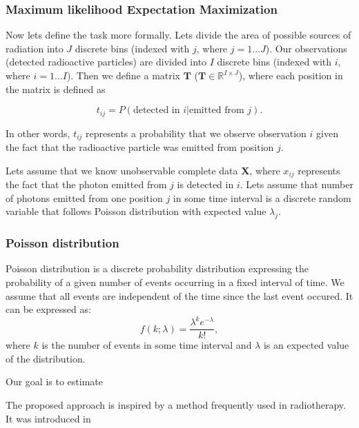 \subsubsection{Maximum likelihood Expectation Maximization}

Now lets define the task more formally.
Lets divide the area of possible sources of radiation into $J$ discrete bins (indexed with $j$, where $j = 1 \dotsc J$).
Our observations (detected radioactive particles) are divided into $I$ discrete bins (indexed with $i$, where $i = 1 \dotsc I$).
Then we define a matrix $\mathbf{T}$ ($\mathbf{T} \in \mathbb{R}^{I \times J}$), where each position in the matrix is defined as

\begin{equation}
  t_{ij} =  P(\textrm{detected in } i | \textrm{emitted from } j).
\end{equation}

In other words, $t_{ij}$ represents a probability that we observe observation $i$ given the fact that the radioactive particle was emitted from position $j$.

Lets assume that we know unobservable complete data $\mathbf{X}$, where $x_{ij}$ represents the fact that the photon emitted from $j$ is detected in $i$.
Lets assume that number of photons emitted from one position $j$ in some time interval is a discrete random variable that follows Poisson distribution with expected value $\lambda_{j}$.









\subsubsection{Poisson distribution}
Poisson distribution is a discrete probability distribution expressing the probability of a given number of events occurring in a fixed interval of time.
We assume that all events are independent of the time since the last event occured.
It can be expressed as:
\begin{equation}
  f(k;\lambda )={\frac {\lambda ^{k}e^{-\lambda }}{k!}},
\end{equation}
where $k$ is the number of events in some time interval and $\lambda$ is an expected value of the distribution.



Our goal is to estimate 

The proposed approach is inspired by a method frequently used in radiotherapy. 
It was introduced in \cite{wilderman}




